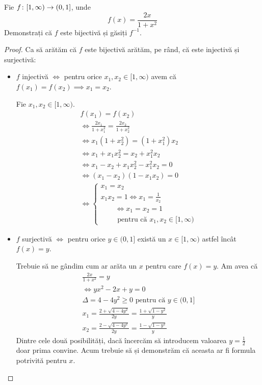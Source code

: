 \begin{exercise}
Fie \(f \colon [1, \infty) \to (0, 1]\), unde
\[
    f(x) = \frac{2x}{1+x^2}
\]
Demonstrați că \(f\) este bijectivă și găsiți \(f^{-1}\).
\end{exercise}
\begin{proof}
Ca să arătăm că \(f\) este bijectivă arătăm, pe rând, că este injectivă și surjectivă:
\begin{itemize}
    \item \(f\) injectivă \(\iff\) pentru orice \(x_1, x_2 \in [1, \infty)\) avem că \(f(x_1) = f(x_2) \implies x_1 = x_2\).

    Fie \(x_1, x_2 \in [1, \infty)\).
    \begin{gather*}
        f(x_1) = f(x_2) \\
        \iff \frac{2x_1}{1 + x_1^2} = \frac{2x_2}{1 + x_2^2} \\
        \iff x_1 (1 + x_2^2) = (1 + x_1^2) x_2 \\
        \iff x_1 + x_1 x_2^2 = x_2 + x_1^2 x_2 \\
        \iff x_1 - x_2 + x_1 x_2^2 - x_1^2 x_2 = 0 \\
        \iff (x_1 - x_2)(1 - x_1 x_2) = 0 \\
        \iff \begin{cases}
        x_1 = x_2 \\
        x_1 x_2 = 1 \iff x_1 = \frac{1}{x_2} \\
        \qquad \iff x_1 = x_2 = 1 \\
        \qquad \text{ pentru că } x_1, x_2 \in [1, \infty)
        \end{cases}
    \end{gather*}
    \item \(f\) surjectivă \(\iff\) pentru orice \(y \in (0, 1]\) există un \(x \in [1, \infty)\) astfel încât \(f(x) = y\).

    Trebuie să ne gândim cum ar arăta un \(x\) pentru care \(f(x) = y\). Am avea că
    \begin{gather*}
        \frac{2x}{1 + x^2} = y \\
        \iff yx^2 - 2x + y = 0 \\
        \Delta = 4 - 4y^2 \geq 0 \text{ pentru că } y \in (0, 1] \\
        x_1 = \frac{2 + \sqrt{4 - 4y^2}}{2y} = \frac{1 + \sqrt{1 - y^2}}{y} \\
        x_2 = \frac{2 - \sqrt{4 - 4y^2}}{2y} = \frac{1 - \sqrt{1 - y^2}}{y}
    \end{gather*}
    Dintre cele două posibilități, dacă încercăm să introducem valoarea \(y = \frac{1}{2}\) doar prima convine. Acum trebuie să și demonstrăm că aceasta ar fi formula potrivită pentru \(x\).


\end{itemize}
\end{proof}
